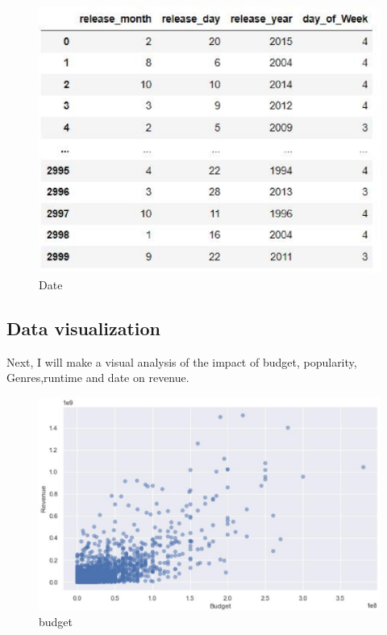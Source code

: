 \begin{figure}[htbp]
  \includegraphics[scale=0.4]{./figures/date1.eps}
  \caption{Date}
\end{figure}



\subsection{Data visualization}
Next, I will make a visual analysis of the impact of budget,
popularity, Genres,runtime and date on revenue.
 \\

\begin{figure}[htbp]
  \includegraphics[scale=0.4]{./figures/budget2.eps}
  \caption{budget}
\end{figure}

